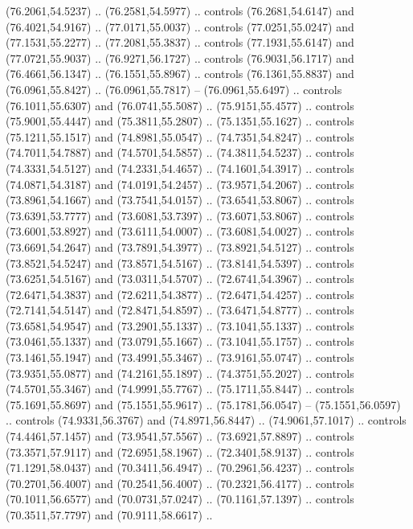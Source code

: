\begin{scope}[cm={{1.25,0.0,0.0,-1.25,(-71.74049,81.13304)}}]
        (76.2061,54.5237) .. (76.2581,54.5977) .. controls (76.2681,54.6147) and
        (76.4021,54.9167) .. (77.0171,55.0037) .. controls (77.0251,55.0247) and
        (77.1531,55.2277) .. (77.2081,55.3837) .. controls (77.1931,55.6147) and
        (77.0721,55.9037) .. (76.9271,56.1727) .. controls (76.9031,56.1717) and
        (76.4661,56.1347) .. (76.1551,55.8967) .. controls (76.1361,55.8837) and
        (76.0961,55.8427) .. (76.0961,55.7817) -- (76.0961,55.6497) .. controls
        (76.1011,55.6307) and (76.0741,55.5087) .. (75.9151,55.4577) .. controls
        (75.9001,55.4447) and (75.3811,55.2807) .. (75.1351,55.1627) .. controls
        (75.1211,55.1517) and (74.8981,55.0547) .. (74.7351,54.8247) .. controls
        (74.7011,54.7887) and (74.5701,54.5857) .. (74.3811,54.5237) .. controls
        (74.3331,54.5127) and (74.2331,54.4657) .. (74.1601,54.3917) .. controls
        (74.0871,54.3187) and (74.0191,54.2457) .. (73.9571,54.2067) .. controls
        (73.8961,54.1667) and (73.7541,54.0157) .. (73.6541,53.8067) .. controls
        (73.6391,53.7777) and (73.6081,53.7397) .. (73.6071,53.8067) .. controls
        (73.6001,53.8927) and (73.6111,54.0007) .. (73.6081,54.0027) .. controls
        (73.6691,54.2647) and (73.7891,54.3977) .. (73.8921,54.5127) .. controls
        (73.8521,54.5247) and (73.8571,54.5167) .. (73.8141,54.5397) .. controls
        (73.6251,54.5167) and (73.0311,54.5707) .. (72.6741,54.3967) .. controls
        (72.6471,54.3837) and (72.6211,54.3877) .. (72.6471,54.4257) .. controls
        (72.7141,54.5147) and (72.8471,54.8597) .. (73.6471,54.8777) .. controls
        (73.6581,54.9547) and (73.2901,55.1337) .. (73.1041,55.1337) .. controls
        (73.0461,55.1337) and (73.0791,55.1667) .. (73.1041,55.1757) .. controls
        (73.1461,55.1947) and (73.4991,55.3467) .. (73.9161,55.0747) .. controls
        (73.9351,55.0877) and (74.2161,55.1897) .. (74.3751,55.2027) .. controls
        (74.5701,55.3467) and (74.9991,55.7767) .. (75.1711,55.8447) .. controls
        (75.1691,55.8697) and (75.1551,55.9617) .. (75.1781,56.0547) --
        (75.1551,56.0597) .. controls (74.9331,56.3767) and (74.8971,56.8447) ..
        (74.9061,57.1017) .. controls (74.4461,57.1457) and (73.9541,57.5567) ..
        (73.6921,57.8897) .. controls (73.3571,57.9117) and (72.6951,58.1967) ..
        (72.3401,58.9137) .. controls (71.1291,58.0437) and (70.3411,56.4947) ..
        (70.2961,56.4237) .. controls (70.2701,56.4007) and (70.2541,56.4007) ..
        (70.2321,56.4177) .. controls (70.1011,56.6577) and (70.0731,57.0247) ..
        (70.1161,57.1397) .. controls (70.3511,57.7797) and (70.9111,58.6617) ..

\end{scope}
